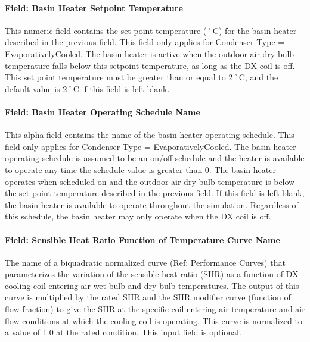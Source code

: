 \paragraph{Field: Basin Heater Setpoint Temperature}\label{field-basin-heater-setpoint-temperature-1-000}

This numeric field contains the set point temperature (˚C) for the basin heater described in the previous field. This field only applies for Condenser Type = EvaporativelyCooled. The basin heater is active when the outdoor air dry-bulb temperature falls below this setpoint temperature, as long as the DX coil is off. This set point temperature must be greater than or equal to 2˚C, and the default value is 2˚C if this field is left blank.

\paragraph{Field: Basin Heater Operating Schedule Name}\label{field-basin-heater-operating-schedule-name-1-000}

This alpha field contains the name of the basin heater operating schedule. This field only applies for Condenser Type = EvaporativelyCooled. The basin heater operating schedule is assumed to be an on/off schedule and the heater is available to operate any time the schedule value is greater than 0. The basin heater operates when scheduled on and the outdoor air dry-bulb temperature is below the set point temperature described in the previous field. If this field is left blank, the basin heater is available to operate throughout the simulation. Regardless of this schedule, the basin heater may only operate when the DX coil is off.

\paragraph{Field: Sensible Heat Ratio Function of Temperature Curve Name}\label{field-sensible-heat-ratio-function-of-temperature-curve-name-1}

The name of a biquadratic normalized curve (Ref: Performance Curves) that parameterizes the variation of the sensible heat ratio (SHR) as a function of DX cooling coil entering air wet-bulb and dry-bulb temperatures. The output of this curve is multiplied by the rated SHR and the SHR modifier curve (function of flow fraction) to give the SHR at the specific coil entering air temperature and air flow conditions at which the cooling coil is operating. This curve is normalized to a value of 1.0 at the rated condition. This input field is optional.

